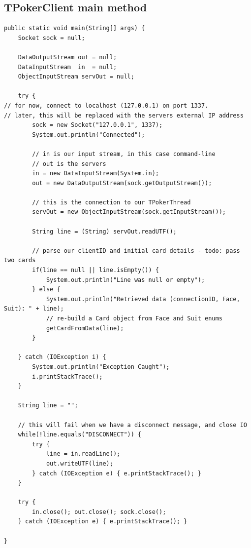 \documentclass[11pt]{article}
\begin{document}
\subsection{TPokerClient main method}
\begin{lstlisting}[breaklines=true]
public static void main(String[] args) {
	Socket sock = null;

	DataOutputStream out = null;
	DataInputStream  in  = null;
	ObjectInputStream servOut = null;

	try {
// for now, connect to localhost (127.0.0.1) on port 1337.
// later, this will be replaced with the servers external IP address
		sock = new Socket("127.0.0.1", 1337);
		System.out.println("Connected");

		// in is our input stream, in this case command-line
		// out is the servers
		in = new DataInputStream(System.in);
		out = new DataOutputStream(sock.getOutputStream());

		// this is the connection to our TPokerThread
		servOut = new ObjectInputStream(sock.getInputStream());

		String line = (String) servOut.readUTF();

		// parse our clientID and initial card details - todo: pass two cards
		if(line == null || line.isEmpty()) {
			System.out.println("Line was null or empty");
		} else {
			System.out.println("Retrieved data (connectionID, Face, Suit): " + line);
			// re-build a Card object from Face and Suit enums
			getCardFromData(line);
		}

	} catch (IOException i) {
		System.out.println("Exception Caught");
		i.printStackTrace();
	}

	String line = "";

	// this will fail when we have a disconnect message, and close IO
	while(!line.equals("DISCONNECT")) {
		try {
			line = in.readLine();
			out.writeUTF(line);
		} catch (IOException e) { e.printStackTrace(); }
	}

	try {
		in.close(); out.close(); sock.close();
	} catch (IOException e) { e.printStackTrace(); }

}
\end{lstlisting}
\end{document}
